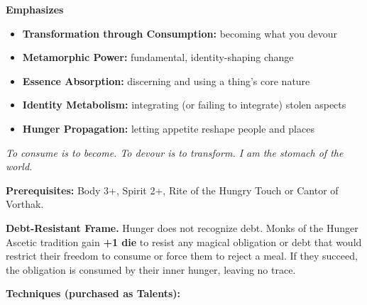 \noindent\textbf{Emphasizes}
\begin{itemize}
  \item \textbf{Transformation through Consumption:} becoming what you devour
  \item \textbf{Metamorphic Power:} fundamental, identity-shaping change
  \item \textbf{Essence Absorption:} discerning and using a thing's core nature
  \item \textbf{Identity Metabolism:} integrating (or failing to integrate) stolen aspects
  \item \textbf{Hunger Propagation:} letting appetite reshape people and places
\end{itemize}

\begin{tcolorbox}[colback=black!5,colframe=red!70!black,title=\textbf{Hunger Ascetic (Vorthak)},breakable]
  \emph{To consume is to become. To devour is to transform. I am the stomach of the world.}

  \vspace{2mm}
  \noindent\textbf{Prerequisites:} Body 3+, Spirit 2+, Rite of the Hungry Touch or Cantor of Vorthak.

  \vspace{2mm}
  \noindent\textbf{Debt-Resistant Frame.} Hunger does not recognize debt. Monks of the Hunger Ascetic tradition gain \textbf{+1 die} to resist any magical obligation or debt that would restrict their freedom to consume or force them to reject a meal. If they succeed, the obligation is consumed by their inner hunger, leaving no trace.

  \vspace{2mm}
  \noindent\textbf{Techniques (purchased as Talents):}


\end{tcolorbox}

